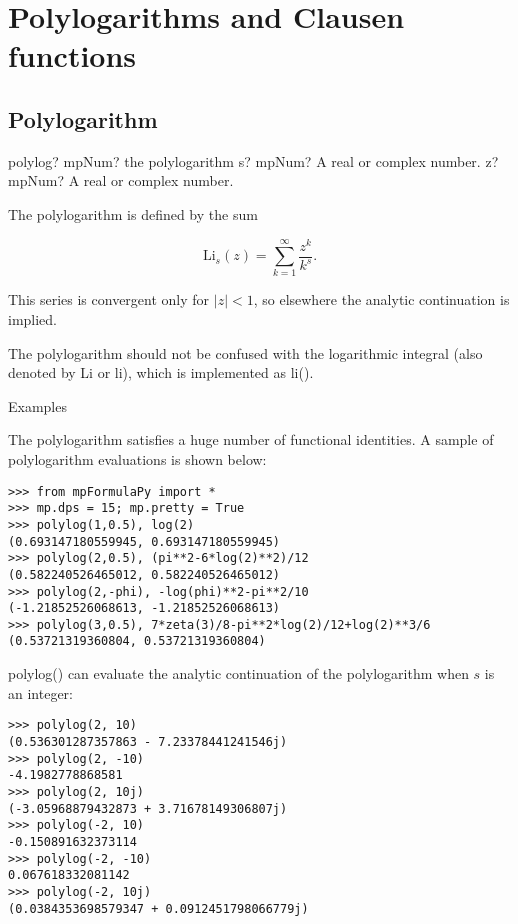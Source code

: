 \newpage
\section{Polylogarithms and Clausen functions}

\subsection{Polylogarithm}

\begin{mpFunctionsExtract}
	\mpFunctionTwo
	{polylog? mpNum? the polylogarithm}
	{s? mpNum? A real or complex number.}
	{z? mpNum? A real or complex number.}		
\end{mpFunctionsExtract}

The polylogarithm is defined by the sum

\begin{equation}
\text{Li}_s(z) = \sum_{k=1}^{\infty} \frac{z^k}{k^s}.
\end{equation}

This series is convergent only for $|z|<1$, so elsewhere the analytic continuation is implied.

\vpara
The polylogarithm should not be confused with the logarithmic integral (also denoted by Li or li), which is implemented as li().

Examples

The polylogarithm satisfies a huge number of functional identities. A sample of polylogarithm evaluations is shown below:


\begin{lstlisting}
>>> from mpFormulaPy import *
>>> mp.dps = 15; mp.pretty = True
>>> polylog(1,0.5), log(2)
(0.693147180559945, 0.693147180559945)
>>> polylog(2,0.5), (pi**2-6*log(2)**2)/12
(0.582240526465012, 0.582240526465012)
>>> polylog(2,-phi), -log(phi)**2-pi**2/10
(-1.21852526068613, -1.21852526068613)
>>> polylog(3,0.5), 7*zeta(3)/8-pi**2*log(2)/12+log(2)**3/6
(0.53721319360804, 0.53721319360804)
\end{lstlisting}

polylog() can evaluate the analytic continuation of the polylogarithm when $s$ is an integer:

\begin{lstlisting}
>>> polylog(2, 10)
(0.536301287357863 - 7.23378441241546j)
>>> polylog(2, -10)
-4.1982778868581
>>> polylog(2, 10j)
(-3.05968879432873 + 3.71678149306807j)
>>> polylog(-2, 10)
-0.150891632373114
>>> polylog(-2, -10)
0.067618332081142
>>> polylog(-2, 10j)
(0.0384353698579347 + 0.0912451798066779j)
\end{lstlisting}




